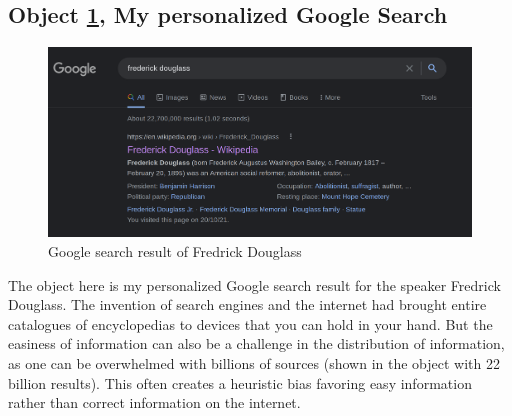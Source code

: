 \documentclass[a4paper,11pt]{article}
\begin{document}




\subsection*{Object \ref{fig:download}, My personalized Google Search}

\begin{figure}[h!]
 \centering
 \includegraphics[scale=0.25]{douglass.png}
 \caption{Google search result of Fredrick Douglass}
 \label{fig:download}
\end{figure}

The object here is my personalized Google search result for the speaker Fredrick Douglass. The invention of search engines and the internet had brought entire catalogues of encyclopedias to devices that you can hold in your hand. But the easiness of information can also be a challenge in the distribution of information, as one can be overwhelmed with billions of sources (shown in the object with 22 billion results). This often creates a heuristic bias favoring easy information rather than correct information on the internet.
\end{document}
